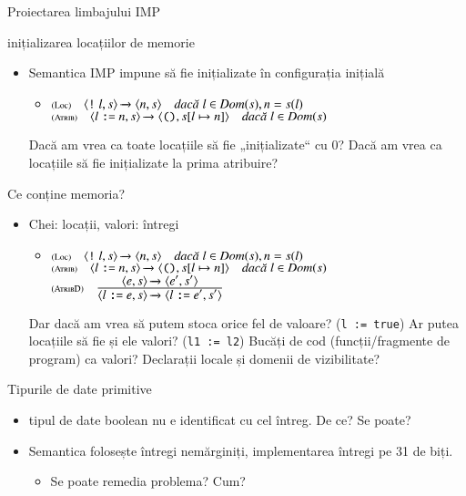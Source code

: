 \documentclass[xcolor=pdftex,romanian,colorlinks]{beamer}
\begin{document}
\begin{section}{Proiectarea limbajului IMP}
\begin{frame}{inițializarea locațiilor de memorie}
\begin{itemize}
\item Semantica IMP impune să fie inițializate în configurația inițială
\begin{itemize}
\item[] $\reg[Loc]{\Ss{\c{\terminal{!} l,\stare}}{\c{n, \stare}}}{}{l\in\Dom(\stare), n = \stare(l)}$
\vitem[] $\reg[Atrib]{\Ss{\c{l \terminal{:=} n,\stare}}{\c{\Sskip,\stare[l \mapsto n]}}}{}{l\in\Dom(\stare)}$
\end{itemize}
 Dacă am vrea ca toate locațiile să fie „inițializate“ cu 0?
 Dacă am vrea ca locațiile să fie inițializate la prima atribuire? 
\end{itemize}
\end{frame}

\begin{frame}{Ce conține memoria?}
\begin{itemize}
\item Chei: locații, valori: întregi
\begin{itemize}
\item[] $\reg[Loc]{\Ss{\c{\terminal{!} l,\stare}}{\c{n, \stare}}}{}{l\in\Dom(\stare), n = \stare(l)}$
\vitem[] $\reg[Atrib]{\Ss{\c{l \terminal{:=} n,\stare}}{\c{\Sskip,\stare[l \mapsto n]}}}{}{l\in\Dom(\stare)}$
\vitem[] $\reg[AtribD]{\Ss{\c{l \terminal{:=} e ,\stare}}{\c{l \terminal{:=} e' ,\stare'}}}{\Ss{\c{e,\stare}}{\c{e',\stare'}}}{}$
\end{itemize}
 Dar dacă am vrea să putem stoca orice fel de valoare?  (\texttt{l := true})
 Ar putea locațiile să fie și ele valori?  (\texttt{l1 := l2})
 Bucăți de cod (funcții/fragmente de program) ca valori?
 Declarații locale și domenii de vizibilitate?
\end{itemize}
\end{frame}

\begin{frame}{Tipurile de date primitive}
\begin{itemize}
\item tipul de date boolean nu e identificat cu cel întreg. De ce? Se poate?
\item Semantica folosește întregi nemărginiți, implementarea întregi pe 31 de biți.
\begin{itemize}
\item Se poate remedia problema?  Cum?
\end{itemize}
\end{itemize}
\end{frame}


\end{section}
\end{document}
